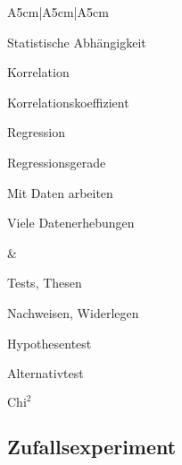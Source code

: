 \documentclass[
	final,
	a4paper,
	oneside,
	parskip=full,
	headings=standardclasses,
	headings=big,
	pointednumbers
]{scrartcl}
\begin{document}
\begin{tabular}{A{5cm}|A{5cm}|A{5cm}}
\begin{tabenum}
            \item{Statistische Abhängigkeit}
            \begin{tabenum}
                \item{Korrelation}
                \begin{tabenum}
                    \item{Korrelationskoeffizient}
                \end{tabenum}
                \item{Regression}
                \begin{tabenum}
                    \item{Regressionsgerade}
                \end{tabenum}
            \end{tabenum}
            \item{Mit Daten arbeiten}
            \item{Viele Datenerhebungen}
        \end{tabenum} &
        \begin{tabenum}
            \item{Tests, Thesen}
            \begin{tabenum}
                \item{Nachweisen, Widerlegen}
            \end{tabenum}
            \item{Hypothesentest}
            \item{Alternativtest}

            \item{$\text{Chi}^2$}
        \end{tabenum}
    \end{tabular}


    \subsection{Zufallsexperiment}
    
\end{document}
